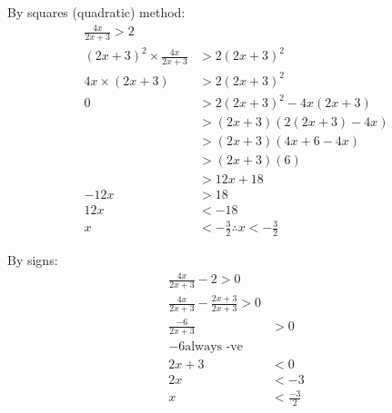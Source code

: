 By squares (quadratic) method:
\begin{align}
  \frac{4x}{2x+3} > 2 \\
  (2x+3)^2 \times \frac{4x}{2x+3} & > 2(2x+3)^2 \\
  4x \times (2x+3) & >  2(2x+3)^2 \\
  0 & > 2(2x+3)^2 - 4x(2x+3) \\
    & > (2x+3)(2(2x+3) -4x) \\
    & > (2x+3)(4x +6 -4x) \\
    & > (2x+3)(6) \\
    & > 12x + 18 \\
    -12x & > 18 \\
    12x  & < -18 \\
       x & < -\frac{3}{2}
    \therefore x < -\frac{3}{2}
\end{align}

By signs:
\begin{align}
  \frac{4x}{2x+3} -2 > 0 \\
  \frac{4x}{2x+3} -\frac{2x+3}{2x+3} > 0 \\
  \frac{-6}{2x+3} & > 0 \\
  -6 \text{always -ve} \\
  2x + 3 & < 0 \\
  2x &< -3 \\
  x & < \frac{-3}{2} \\
\end{align}